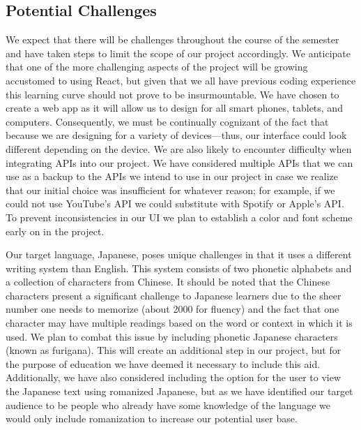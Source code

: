 \documentclass[conference, 12pt]{IEEEtran}
\begin{document}
\subsection{Potential Challenges}
We expect that there will be challenges throughout the course of the semester and have taken steps to limit the scope of our project accordingly. 
We anticipate that one of the more challenging aspects of the project will be growing accustomed to using React, but given that we all have previous coding experience this learning curve should not prove to be insurmountable. 
We have chosen to create a web app as it will allow us to design for all smart phones, tablets, and computers.
Consequently, we must be continually cognizant of the fact that because we are designing for a variety of devices---thus, our interface could look different depending on the device.
We are also likely to encounter difficulty when integrating APIs into our project. 
We have considered multiple APIs that we can use as a backup to the APIs we intend to use in our project in case we realize that our initial choice was insufficient for whatever reason; for example, if we could not use YouTube's API we could substitute with Spotify or Apple's API. 
To prevent inconsistencies in our UI we plan to establish a color and font scheme early on in the project.

Our target language, Japanese, poses unique challenges in that it uses a different writing system than English. 
This system consists of two phonetic alphabets and a collection of characters from Chinese. 
It should be noted that the Chinese characters present a significant challenge to Japanese learners due to the sheer number one needs to memorize (about 2000 for fluency) and the fact that one character may have multiple readings based on the word or context in which it is used. 
We plan to combat this issue by including phonetic Japanese characters (known as furigana). This will create an additional step in our project, but for the purpose of education we have deemed it necessary to include this aid.
Additionally, we have also considered including the option for the user to view the Japanese text using romanized Japanese, but as we have identified our target audience to be people who already have some knowledge of the language we would only include romanization to increase our potential user base.
\end{document}
